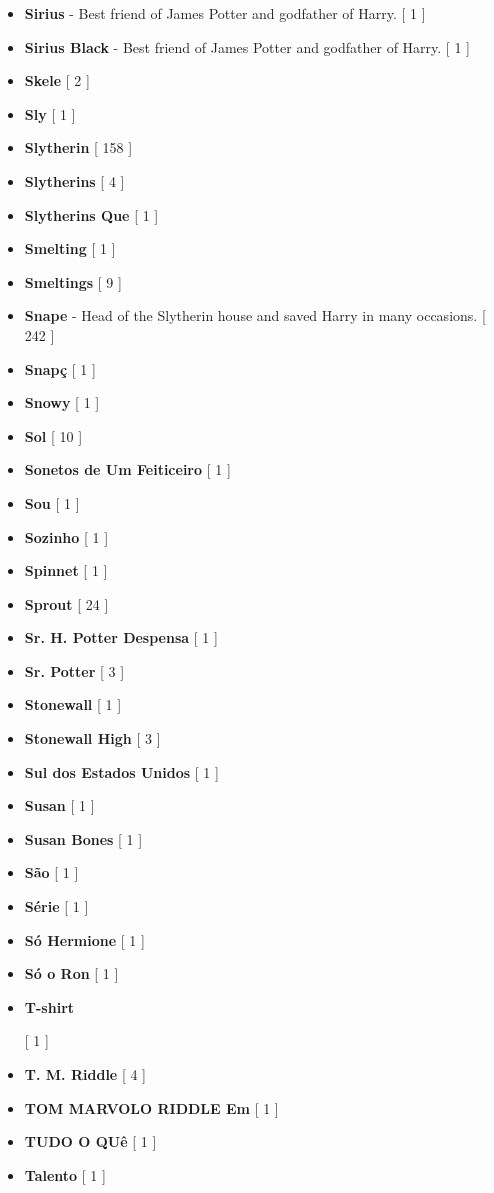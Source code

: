 \documentclass[a4paper]{article}
\begin{document}
\begin{itemize}
	\item \textbf{Sirius} - Best friend of James Potter and godfather of Harry. [ 1 ]
	\item \textbf{Sirius Black} - Best friend of James Potter and godfather of Harry. [ 1 ]
	\item \textbf{Skele} [ 2 ]
	\item \textbf{Sly} [ 1 ]
	\item \textbf{Slytherin} [ 158 ]
	\item \textbf{Slytherins} [ 4 ]
	\item \textbf{Slytherins Que} [ 1 ]
	\item \textbf{Smelting} [ 1 ]
	\item \textbf{Smeltings} [ 9 ]
	\item \textbf{Snape} - Head of the Slytherin house and saved Harry in many occasions. [ 242 ]
	\item \textbf{Snapç} [ 1 ]
	\item \textbf{Snowy} [ 1 ]
	\item \textbf{Sol} [ 10 ]
	\item \textbf{Sonetos de Um Feiticeiro} [ 1 ]
	\item \textbf{Sou} [ 1 ]
	\item \textbf{Sozinho} [ 1 ]
	\item \textbf{Spinnet} [ 1 ]
	\item \textbf{Sprout} [ 24 ]
	\item \textbf{Sr. H. Potter Despensa} [ 1 ]
	\item \textbf{Sr. Potter} [ 3 ]
	\item \textbf{Stonewall} [ 1 ]
	\item \textbf{Stonewall High} [ 3 ]
	\item \textbf{Sul dos Estados Unidos} [ 1 ]
	\item \textbf{Susan} [ 1 ]
	\item \textbf{Susan Bones} [ 1 ]
	\item \textbf{São} [ 1 ]
	\item \textbf{Série} [ 1 ]
	\item \textbf{Só Hermione} [ 1 ]
	\item \textbf{Só o Ron} [ 1 ]
	\item \hypertarget{T}{\textbf{T-shirt}} [ 1 ]
	\item \textbf{T. M. Riddle} [ 4 ]
	\item \textbf{TOM MARVOLO RIDDLE Em} [ 1 ]
	\item \textbf{TUDO O QUê} [ 1 ]
	\item \textbf{Talento} [ 1 ]

\end{itemize}
\end{document}
